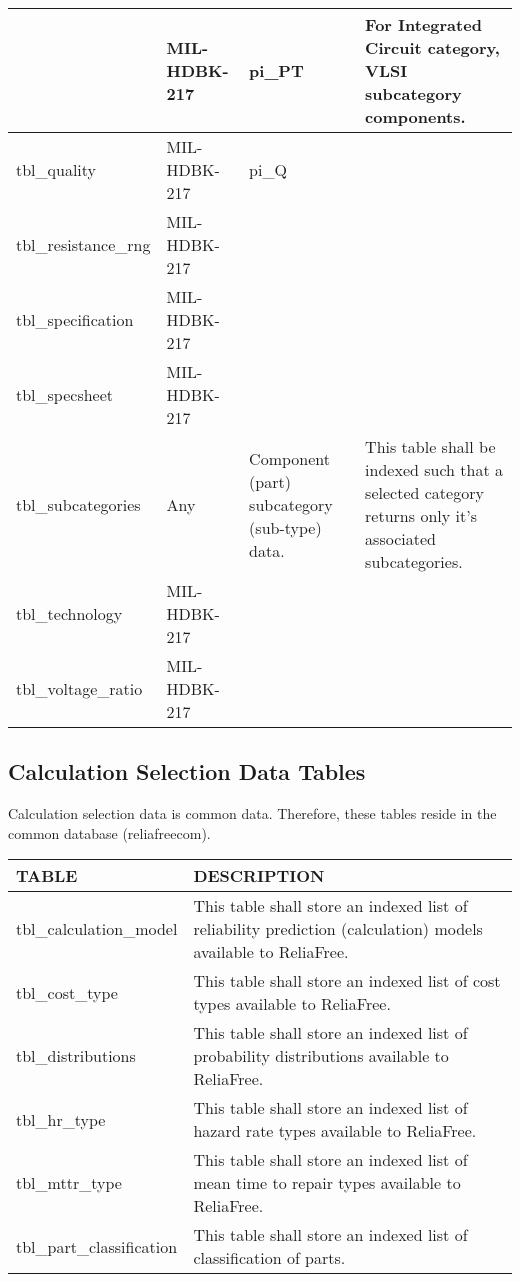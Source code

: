 \documentclass[11pt, 12pt, twoside, onecolumn]{article}
\begin{document}
\begin{landscape}
\begin{tabular}{p{2.0in} | m{1.5in} | m{1.5in} | p{3.75in}}
    & MIL-HDBK-217 & pi\_PT & For Integrated Circuit category, VLSI subcategory components. \\ \hline
    tbl\_quality & MIL-HDBK-217 & pi\_Q & \\ \hline
    tbl\_resistance\_rng & MIL-HDBK-217 & & \\ \hline
    tbl\_specification & MIL-HDBK-217 & & \\ \hline
    tbl\_specsheet & MIL-HDBK-217 & & \\ \hline
    tbl\_subcategories & Any & Component (part) subcategory (sub-type) data. & This table shall be indexed such that a selected category returns only it's associated subcategories. \\ \hline
    tbl\_technology & MIL-HDBK-217 & & \\ \hline
    tbl\_voltage\_ratio & MIL-HDBK-217 & & \\ \hline
    \hline
    \end{tabular}
    \end{landscape}

\subsection{\bf \large Calculation Selection Data Tables}

\noindent Calculation selection data is common data.  Therefore, these tables reside in the common database (reliafreecom). \\

    \begin{landscape}
    \begin{longtable}{ll}
    TABLE & DESCRIPTION \\
    \hline
    tbl\_calculation\_model & This table shall store an indexed list of reliability prediction (calculation) models available to ReliaFree. \\
    tbl\_cost\_type & This table shall store an indexed list of cost types available to ReliaFree. \\
    tbl\_distributions & This table shall store an indexed list of probability distributions available to ReliaFree. \\
    tbl\_hr\_type & This table shall store an indexed list of hazard rate types available to ReliaFree. \\
    tbl\_mttr\_type & This table shall store an indexed list of mean time to repair types available to ReliaFree. \\
    tbl\_part\_classification & This table shall store an indexed list of classification of parts. \\
    \hline
    \end{longtable}
    \end{landscape}
\end{document}
